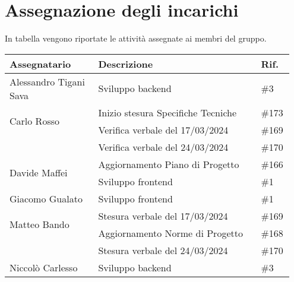 \section{Assegnazione degli incarichi}
In tabella vengono riportate le attività assegnate ai membri del gruppo.
\begin{center}
	{
		\renewcommand{\arraystretch}{1.5}
		\begin{tabular}{p{0.30\linewidth}|p{0.55\linewidth}|p{0.10\linewidth}}
			\textbf{Assegnatario}          & \textbf{Descrizione}               & \textbf{Rif.} \\

			\hline
			Alessandro Tigani Sava         & Sviluppo backend                   & \#3           \\
			\hline
			\multirow{2}{*}{Carlo Rosso}   & Inizio stesura Specifiche Tecniche & \#173         \\
			\cline{2-3}
			                               & Verifica verbale del 17/03/2024    & \#169         \\
			\cline{2-3}
			                               & Verifica verbale del 24/03/2024    & \#170         \\
			\hline
			\multirow{2}{*}{Davide Maffei} & Aggiornamento Piano di Progetto    & \#166         \\
			\cline{2-3}
			                               & Sviluppo frontend                  & \#1           \\
			\hline
			Giacomo Gualato                & Sviluppo frontend                  & \#1           \\
			\hline
			\multirow{2}{*}{Matteo Bando}  & Stesura verbale del 17/03/2024     & \#169         \\
			\cline{2-3}
			                               & Aggiornamento Norme di Progetto    & \#168         \\
			\cline{2-3}
			                               & Stesura verbale del 24/03/2024     & \#170         \\
			\hline
			Niccolò Carlesso               & Sviluppo backend                   & \#3           \\
			\hline
		\end{tabular}
	}
\end{center}
